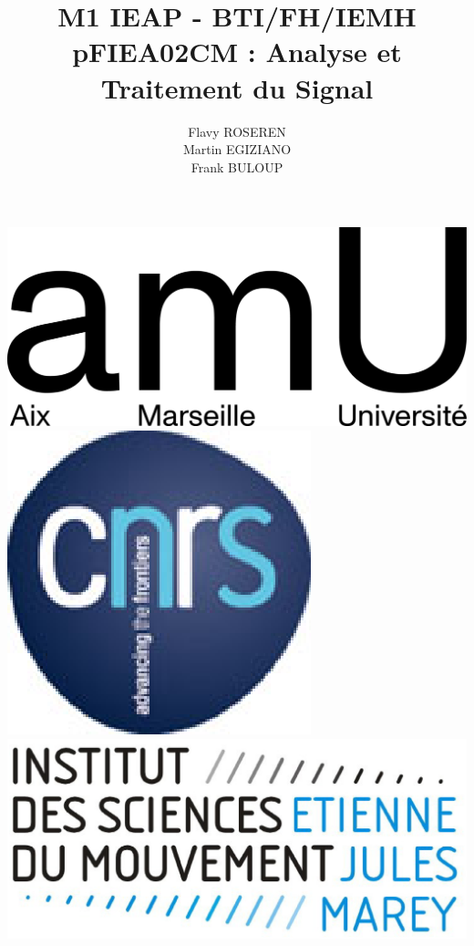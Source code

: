 \documentclass{beamer}
\title{M1 IEAP - BTI/FH/IEMH\\pFIEA02CM : Analyse et Traitement du Signal}
\author{Flavy ROSEREN\\Martin EGIZIANO\\Frank BULOUP}
\institute{Aix Marseille Université\\Institut des Sciences du Mouvement}
\date{}
\begin{document}
 
 
\begin{frame}[plain] 
	\titlepage 
	\vspace{1cm}
	\includegraphics[scale=0.6]{images/LogoAMU.png}\hspace*{2cm}
	\includegraphics[scale=0.2]{images/LogoCNRS.eps}\hspace*{2cm}
	\includegraphics[scale=0.1]{images/LogoISM.eps}
\end{frame}
\end{document}
